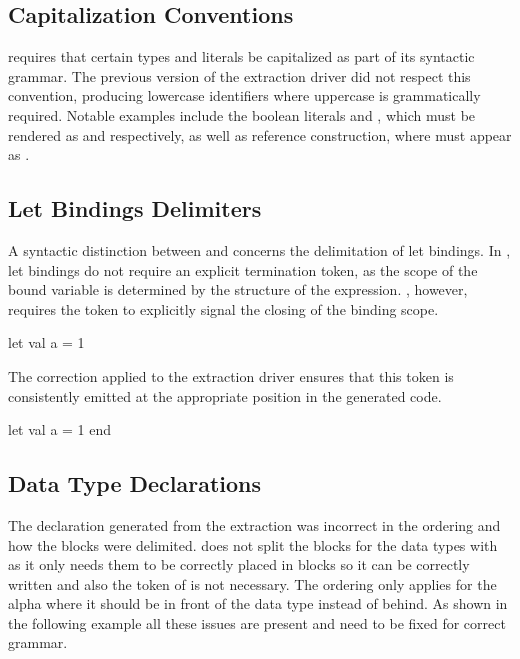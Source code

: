 \subsection{Capitalization Conventions}

\cml requires that certain types and literals be capitalized as part of its syntactic grammar. The previous version of the extraction driver did 
not respect this convention, producing lowercase identifiers where uppercase is grammatically required. Notable examples include the boolean literals  
and , which must be rendered as  and  respectively, as well as reference construction, where  must 
appear as .

\subsection{Let Bindings Delimiters}

A syntactic distinction between \whyml and \cml concerns the delimitation of let bindings. In \whyml, let bindings do not require an explicit termination token, as the 
scope of the bound variable is determined by the structure of the expression. \cml, however, requires the  token to explicitly signal the closing of 
the binding scope. 

\begin{cakeml}
    let val a = 1
\end{cakeml} 

The correction applied to the extraction driver ensures that this token is consistently emitted at the appropriate position in the generated code.

\begin{cakeml}
    let val a = 1 end
\end{cakeml} 

\subsection{Data Type Declarations}

The declaration generated from the extraction was incorrect in the ordering and how the blocks were delimited. \cml does not split the blocks for the data types
with \inlinecode{*} as it only needs them to be correctly placed in blocks so it can be correctly written and also the token of is not necessary. The ordering only 
applies for the alpha where it should be in front of the data type instead of behind. As shown in the following example all these issues are present and need to be
fixed for correct \cml grammar.


